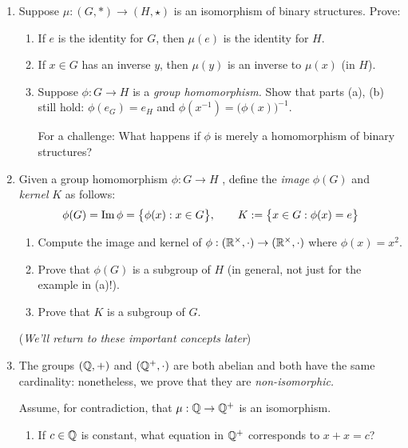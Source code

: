 \begin{exercises}{}
\begin{enumerate}
		
		\goodbreak
	  
	  
	  \item\label{exs:structural1} Suppose $\mu:(G,*)\to (H,\star)$ is an isomorphism of binary structures. Prove:
	  \begin{enumerate}
	    \item\label{exs:structidentity} If $e$ is the identity for $G$, then $\mu(e)$ is the identity for $H$.
	    
	    \item If $x\in G$ has an inverse $y$, then $\mu(y)$ is an inverse to $\mu(x)$ (in $H$).
	    
	    \item Suppose $\phi:G\to H$ is a \emph{group homomorphism.} Show that parts (a), (b) still hold: $\phi(e_G)=e_H$ and $\phi(x^{-1})=\bigl(\phi(x)\bigr)^{-1}$.\par
	    For a challenge: What happens if $\phi$ is merely a homomorphism of binary structures?
	  \end{enumerate}
	
		
		\goodbreak
		
		
	  \item\label{exs:kernelintro} Given a group homomorphism $\phi:G\to H$ , define the \emph{image} $\phi(G)$ and \emph{kernel} $K$ as follows:
	  \[
	  	\phi(G)=\operatorname{Im} \phi=\bigl\{\phi(x):x\in G\bigr\},\qquad
	  	K:=\bigl\{x\in G:\phi(x)=e\bigr\}
	  \]
	  \begin{enumerate}
	    \item Compute the image and kernel of $\phi:(\mathbb{R}^\times,\cdot)\to(\mathbb{R}^\times,\cdot)$ where $\phi(x)=x^2$.
	    \item Prove that $\phi(G)$ is a subgroup of $H$ (in general, not just for the example in (a)!).
	    \item Prove that $K$ is a subgroup of $G$.
	  \end{enumerate}
	  (\emph{We'll return to these important concepts later})
			
		

		
		\item\label{exs:qnoniso} The groups $(\mathbb{Q},+)$ and $(\mathbb{Q}^+,\cdot)$ are both abelian and both have the same cardinality: nonetheless, we prove that they are \emph{non-isomorphic.}\par
		Assume, for contradiction, that $\mu:\mathbb{Q}\to\mathbb{Q}^+$ is an isomorphism.
		\begin{enumerate}
		  \item If $c\in\mathbb{Q}$ is constant, what equation in $\mathbb{Q}^+$ corresponds to $x+x=c$?
		  

\end{enumerate}
\end{enumerate}
\end{exercises}
